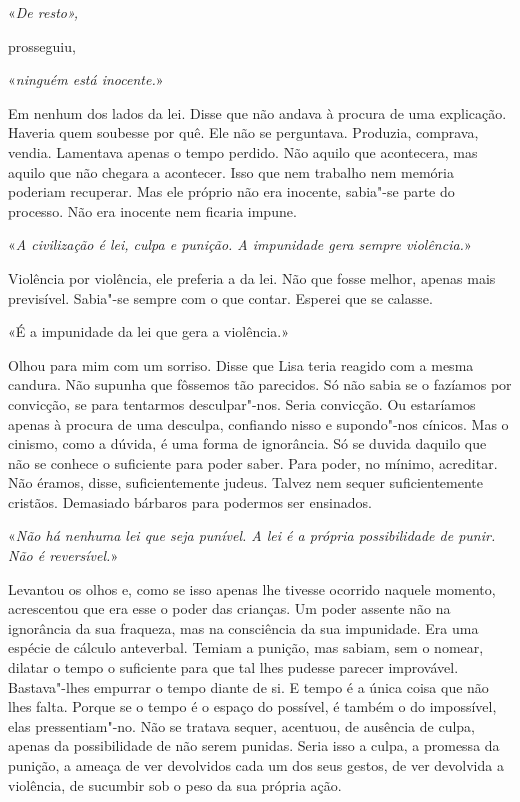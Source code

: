 «\emph{De resto»,}

prosseguiu,

«\emph{ninguém está inocente.}»

Em nenhum dos lados da lei. Disse que não andava à procura de uma
explicação. Haveria quem soubesse por quê. Ele não se perguntava.
Produzia, comprava, vendia. Lamentava apenas o tempo perdido. Não aquilo
que acontecera, mas aquilo que não chegara a acontecer. Isso que nem
trabalho nem memória poderiam recuperar. Mas ele próprio não era
inocente, sabia"-se parte do processo. Não era inocente nem ficaria
impune.

«\emph{A civilização é lei, culpa e punição. A impunidade gera sempre
violência.}»

Violência por violência, ele preferia a da lei. Não que fosse melhor,
apenas mais previsível. Sabia"-se sempre com o que contar. Esperei que
se calasse.

«É a impunidade da lei que gera a violência.»

Olhou para mim com um sorriso. Disse que Lisa teria reagido com a mesma
candura. Não supunha que fôssemos tão parecidos. Só não sabia se o
fazíamos por convicção, se para tentarmos desculpar"-nos. Seria
convicção. Ou estaríamos apenas à procura de uma desculpa, confiando
nisso e supondo"-nos cínicos. Mas o cinismo, como a dúvida, é uma forma
de ignorância. Só se duvida daquilo que não se conhece o suficiente para
poder saber. Para poder, no mínimo, acreditar. Não éramos, disse,
suficientemente judeus. Talvez nem sequer suficientemente cristãos.
Demasiado bárbaros para podermos ser ensinados.

«\emph{Não há nenhuma lei que seja punível. A lei é a própria
possibilidade de punir. Não é reversível.}»

Levantou os olhos e, como se isso apenas lhe tivesse ocorrido naquele
momento, acrescentou que era esse o poder das crianças. Um poder assente
não na ignorância da sua fraqueza, mas na consciência da sua impunidade.
Era uma espécie de cálculo anteverbal. Temiam a punição, mas sabiam, sem
o nomear, dilatar o tempo o suficiente para que tal lhes pudesse parecer
improvável. Bastava"-lhes empurrar o tempo diante de si. E tempo é a
única coisa que não lhes falta. Porque se o tempo é o espaço do
possível, é também o do impossível, elas pressentiam"-no. Não se tratava
sequer, acentuou, de ausência de culpa, apenas da possibilidade de não
serem punidas. Seria isso a culpa, a promessa da punição, a ameaça de
ver devolvidos cada um dos seus gestos, de ver devolvida a violência, de
sucumbir sob o peso da sua própria ação.

